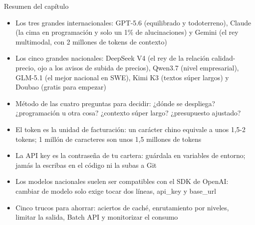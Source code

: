 \begin{tcbsummary}{Resumen del capítulo}
\begin{itemize}
  \item Los tres grandes internacionales: GPT-5.6 (equilibrado y todoterreno), Claude (la cima en programación y solo un 1\% de alucinaciones) y Gemini (el rey multimodal, con 2 millones de tokens de contexto)
  \item Los cinco grandes nacionales: DeepSeek V4 (el rey de la relación calidad-precio, ojo a los avisos de subida de precios), Qwen3.7 (nivel empresarial), GLM-5.1 (el mejor nacional en SWE), Kimi K3 (textos súper largos) y Doubao (gratis para empezar)
  \item Método de las cuatro preguntas para decidir: ¿dónde se despliega? ¿programación u otra cosa? ¿contexto súper largo? ¿presupuesto ajustado?
  \item El token es la unidad de facturación: un carácter chino equivale a unos 1,5-2 tokens; 1 millón de caracteres son unos 1,5 millones de tokens
  \item La API key es la contraseña de tu cartera: guárdala en variables de entorno; jamás la escribas en el código ni la subas a Git
  \item Los modelos nacionales suelen ser compatibles con el SDK de OpenAI: cambiar de modelo solo exige tocar dos líneas, api\_key y base\_url
  \item Cinco trucos para ahorrar: aciertos de caché, enrutamiento por niveles, limitar la salida, Batch API y monitorizar el consumo
\end{itemize}

\end{tcbsummary}
